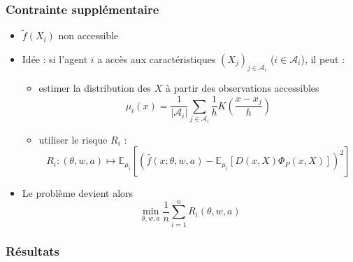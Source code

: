 \documentclass[c]{beamer}
\begin{document}
\begin{frame}
    \frametitle{Contrainte supplémentaire}

    \begin{itemize}
        \item $\tilde{f}(X_i)$ non accessible
        \item Idée : si l'agent $i$ a accès aux caractéristiques $(X_j)_{j \in \mathcal{A}_i}$
            ($i \in \mathcal{A}_i$), il peut :
            \begin{itemize}
                \item estimer la distribution des $X$ à partir des observations
                    accessibles
                    \[
                        \mu_i(x) = \frac{1}{|\mathcal{A}_i|} \sum_{j \in \mathcal{A}_i} \frac{1}{h} K\left(\frac{x - x_j}{h}\right)
                    \]
                \item utiliser le risque $R_i$ :
                    \[
                        R_i : (\theta, w, a) \mapsto \mathbb{E}_{\mu_i} \left[ \left( \hat{f}(x; \theta, w, a) - \mathbb{E}_{\mu_i}[D(x, X) \Phi_P(x, X)]\right)^2 \right]
                    \]
            \end{itemize}
        \item Le problème devient alors
            \[
                \min_{\theta, w, a} \frac{1}{n} \sum_{i = 1}^n R_i(\theta, w, a)
            \]
    \end{itemize}
\end{frame}

\begin{frame}
    \frametitle{Résultats}

\end{frame}
\end{document}
